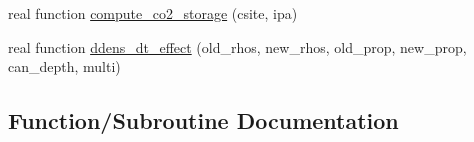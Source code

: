 \begin{DoxyCompactItemize}
\item 
real function \hyperlink{namespacebudget__utils_aa1c4f8466010b1673f2914f1bfe9b6ee}{compute\+\_\+co2\+\_\+storage} (csite, ipa)
\item 
real function \hyperlink{namespacebudget__utils_ae7ad8d90c28490b0b1c920e7a2656345}{ddens\+\_\+dt\+\_\+effect} (old\+\_\+rhos, new\+\_\+rhos, old\+\_\+prop, new\+\_\+prop, can\+\_\+depth, multi)
\end{DoxyCompactItemize}


\subsection{Function/\+Subroutine Documentation}

